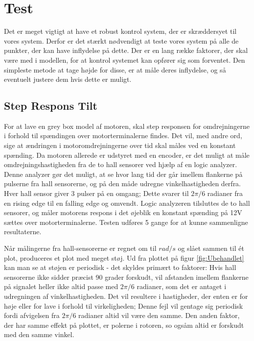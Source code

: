 \section{Test}

Det er meget vigtigt at have et robust kontrol system, der er skræddersyet til vores system. Derfor er det stærkt nødvendigt at teste vores system på alle de punkter, der kan have inflydelse på dette. Der er en lang række faktorer, der skal være med i modellen, for at kontrol systemet kan opfører sig som forventet. Den simpleste metode at tage højde for disse, er at måle deres inflydelse, og så eventuelt justere dem hvis dette er muligt.

\subsection{Step Respons Tilt}

For at lave en grey box model af motoren, skal step responsen for omdrejningerne i forhold til spændingen over motorterminalerne findes. Det vil, med andre ord, sige at ændringen i motoromdrejningerne over tid skal måles ved en konstant spænding. Da motoren allerede er udstyret med en encoder, er det muligt at måle omdrejningshastigheden fra de to hall sensorer ved hjælp af en logic analyzer. Denne analyzer gør det muligt, at se hvor lang tid der går imellem flankerne på pulserne fra hall sensorerne, og på den måde udregne vinkelhastigheden derfra. 
Hver hall sensor giver 3 pulser på en omgang; Dette svarer til $2\pi/6$ radianer fra en rising edge til en falling edge og omvendt. Logic analyzeren tilsluttes de to hall sensorer, og måler motorens respons i det øjeblik en konstant spænding på 12V sættes over motorterminalerne. Testen udføres 5 gange for at kunne sammenligne resultaterne. 

Når målingerne fra hall-sensorerne er regnet om til $rad/s$ og slået sammen til ét plot, produceres et plot med meget støj. Ud fra plottet på figur \ref{fig:Ubehandlet} kan man se at støjen er periodisk - det skyldes primært to faktorer: Hvis hall sensorerne ikke sidder præcist 90 grader forskudt, vil afstanden imellem flankerne på signalet heller ikke altid passe med $2\pi/6$ radianer, som det er antaget i udregningen af vinkelhastigheden. Det vil resultere i hastigheder, der enten er for høje eller for lave i forhold til virkeligheden; Denne fejl vil gentage sig periodisk fordi afvigelsen fra $2\pi/6$ radianer altid vil være den samme. Den anden faktor, der har samme effekt på plottet, er polerne i rotoren, so ogsåm altid er forskudt med den samme vinkel.


